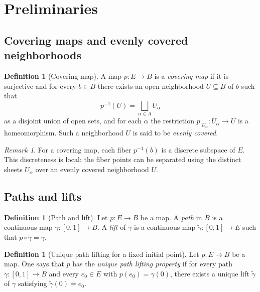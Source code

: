 \documentclass[11pt,a4paper]{article}
\theoremstyle{definition}
\newtheorem{definition}[theorem]{Definition}
\theoremstyle{remark}
\newtheorem{remark}[theorem]{Remark}
\begin{document}
\section{Preliminaries}
\label{sec:preliminaries}

\subsection{Covering maps and evenly covered neighborhoods}
\label{sec:covering}

\begin{definition}[Covering map]
\label{def:covering-map}
A map \(p:E\to B\) is a \emph{covering map} if it is surjective and for every \(b\in B\) there exists an open neighborhood \(U\subseteq B\) of \(b\) such that
\[
p^{-1}(U)=\bigsqcup_{\alpha\in A} U_\alpha
\]
as a disjoint union of open sets, and for each \(\alpha\) the restriction \(p|_{U_\alpha}:U_\alpha\to U\) is a homeomorphism. Such a neighborhood \(U\) is said to be \emph{evenly covered}.
\end{definition}

\begin{remark}
\label{rem:discrete-fiber}
For a covering map, each fiber \(p^{-1}(b)\) is a discrete subspace of \(E\). This discreteness is local: the fiber points can be separated using the distinct sheets \(U_\alpha\) over an evenly covered neighborhood \(U\).
\end{remark}

\subsection{Paths and lifts}
\label{sec:paths}

\begin{definition}[Path and lift]
\label{def:path-lift}
Let \(p:E\to B\) be a map. A \emph{path} in \(B\) is a continuous map \(\gamma:[0,1]\to B\). A \emph{lift} of \(\gamma\) is a continuous map \(\tilde\gamma:[0,1]\to E\) such that \(p\circ \tilde\gamma=\gamma\).
\end{definition}

\begin{definition}[Unique path lifting for a fixed initial point]
\label{def:upl}
Let \(p:E\to B\) be a map. One says that \(p\) has the \emph{unique path lifting property} if for every path \(\gamma:[0,1]\to B\) and every \(e_0\in E\) with \(p(e_0)=\gamma(0)\), there exists a unique lift \(\tilde\gamma\) of \(\gamma\) satisfying \(\tilde\gamma(0)=e_0\).
\end{definition}
\end{document}
